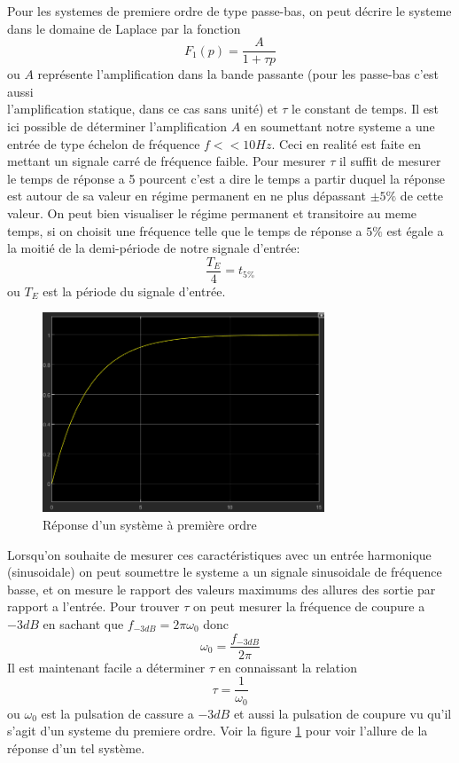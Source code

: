 \documentclass[12pt, a4paper]{report}
\begin{document}
Pour les systemes de premiere ordre de type passe-bas, on peut décrire le systeme dans le domaine de Laplace
par la fonction 
\[
    F_{1}(p) = \frac{A}{1 + \tau p}     
\]
ou $A$ représente l'amplification dans la bande passante (pour les passe-bas c'est aussi\\ l'amplification statique, dans ce cas sans unité)
et $\tau$ le constant de temps. Il est ici possible de déterminer l'amplification $A$ en soumettant notre systeme
a une entrée de type échelon de fréquence $f << 10Hz$. Ceci en realité est faite en mettant un signale carré de fréquence faible. Pour mesurer $\tau$ il suffit de mesurer le temps de réponse a 5 pourcent
c'est a dire le temps a partir duquel la réponse est autour de sa valeur en régime permanent en ne plus dépassant $\pm 5\%$ de cette valeur. On peut bien visualiser
le régime permanent et transitoire au meme temps, si on choisit une fréquence telle que le temps de réponse a $5\%$ est égale a la moitié de la demi-période de notre
signale d'entrée:
\[
    \frac{T_{E}}{4} = t_{5\%}
\]
ou $T_{E}$ est la période du signale d'entrée.
\par
\begin{figure}[h]
    \centering
    \includegraphics[width=0.75\textwidth]{reponse1erordregenerale.png}
    \caption{Réponse d'un système à première ordre}
    \label{fig:reponse1erordre}
\end{figure}
Lorsqu'on souhaite de mesurer ces caractéristiques avec un entrée harmonique (sinusoidale) on peut soumettre le systeme
a un signale sinusoidale de fréquence basse, et on mesure le rapport des valeurs maximums des allures des sortie par rapport a 
l'entrée. Pour trouver $\tau$ on peut mesurer la fréquence de coupure a $-3dB$ en sachant que 
$f_{-3dB} = 2 \pi \omega_{0}$ donc
\[
    \omega_{0} = \frac{f_{-3dB}}{2 \pi}
\]
Il est maintenant facile a déterminer $\tau$ en connaissant la relation
\[
    \tau = \frac{1}{\omega_{0}}
\]
ou $\omega_{0}$ est la pulsation de cassure a $-3dB$ et aussi la pulsation de coupure vu qu'il s'agit 
d'un systeme du premiere ordre. Voir la figure \ref{fig:reponse1erordre} pour voir l'allure de la réponse
d'un tel système.
\end{document}
